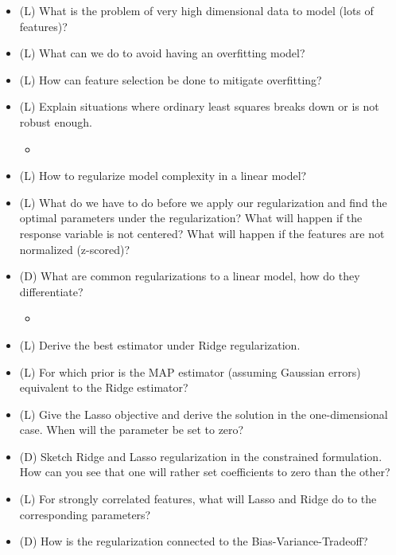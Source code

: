 \begin{itemize}
    \item (L) What is the problem of very high dimensional data to model (lots of features)?
    \answerboxS
    \item (L) What can we do to avoid having an overfitting model?
    \answerboxM
    \item (L) How can feature selection be done to mitigate overfitting?
    \answerboxM
    \item (L) Explain situations where ordinary least squares breaks down or is not robust enough.
    \begin{itemize}
        \item {}
    \end{itemize}
    \answerboxM
    \item (L) How to regularize model complexity in a linear model?
    \answerboxM
    \item (L) What do we have to do before we apply our regularization and find the optimal parameters under the regularization? 
    What will happen if the response variable is not centered? What will happen 
    if the features are not normalized (z-scored)?
    \answerboxM
    \item (D) What are common regularizations to a linear model, how do they differentiate?
    \begin{itemize}
        \item {}
    \end{itemize}
    \answerboxM
    \item (L) Derive the best estimator under Ridge regularization.
    \answerboxM
    \item (L) For which prior is the MAP estimator (assuming Gaussian errors) equivalent to the Ridge estimator?
    \answerboxM
    \item (L) Give the Lasso objective and derive the solution in the one-dimensional case. When will
    the parameter be set to zero?
    \answerboxL
    \item (D) Sketch Ridge and Lasso regularization in the constrained formulation. How can you
    see that one will rather set coefficients to zero than the other?
    \answerboxL
    \item (L) For strongly correlated features, what will Lasso and Ridge do to the corresponding parameters?
    \answerboxS
    \item (D) How is the regularization connected to the Bias-Variance-Tradeoff?
    \answerboxM
\end{itemize}

